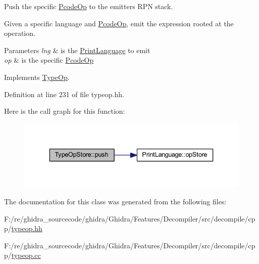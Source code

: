 Push the specific \mbox{\hyperlink{class_pcode_op}{Pcode\+Op}} to the emitter\textquotesingle{}s R\+PN stack. 

Given a specific language and \mbox{\hyperlink{class_pcode_op}{Pcode\+Op}}, emit the expression rooted at the operation. 
\begin{DoxyParams}{Parameters}
{\em lng} & is the \mbox{\hyperlink{class_print_language}{Print\+Language}} to emit \\
\hline
{\em op} & is the specific \mbox{\hyperlink{class_pcode_op}{Pcode\+Op}} \\
\hline
\end{DoxyParams}


Implements \mbox{\hyperlink{class_type_op_ac9c9544203ed74dabe6ac662b653b2af}{Type\+Op}}.



Definition at line 231 of file typeop.\+hh.

Here is the call graph for this function\+:
\nopagebreak
\begin{figure}[H]
\begin{center}
\leavevmode
\includegraphics[width=336pt]{class_type_op_store_a71bd20b40e4cf78ac2c6c909a7924e61_cgraph}
\end{center}
\end{figure}


The documentation for this class was generated from the following files\+:\begin{DoxyCompactItemize}
\item 
F\+:/re/ghidra\+\_\+sourcecode/ghidra/\+Ghidra/\+Features/\+Decompiler/src/decompile/cpp/\mbox{\hyperlink{typeop_8hh}{typeop.\+hh}}\item 
F\+:/re/ghidra\+\_\+sourcecode/ghidra/\+Ghidra/\+Features/\+Decompiler/src/decompile/cpp/\mbox{\hyperlink{typeop_8cc}{typeop.\+cc}}\end{DoxyCompactItemize}
